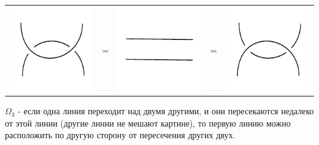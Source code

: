 \begin{tabular}{
>{\centering\arraybackslash}m{3cm}>{\centering\arraybackslash}m{0.4cm}
>{\centering\arraybackslash}m{3cm}>{\centering\arraybackslash}m{0.4cm}
>{\centering\arraybackslash}m{3cm}
}
\includegraphics{images/two-loops-up.pdf}
&
=
&
\includegraphics{images/two-line.pdf}
&
=
&
\includegraphics{images/two-loops-down.pdf}
\end{tabular}


$\Omega_3$ - если одна линия переходит над двумя другими, и они пересекаются недалеко от этой линии (другие линии не мешают картине), то первую линию можно расположить по другую сторону от пересечения других двух.

